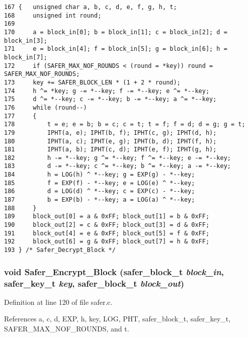 \footnotesize\begin{verbatim}167 {   unsigned char a, b, c, d, e, f, g, h, t;
168     unsigned int round;
169 
170     a = block_in[0]; b = block_in[1]; c = block_in[2]; d = block_in[3];
171     e = block_in[4]; f = block_in[5]; g = block_in[6]; h = block_in[7];
172     if (SAFER_MAX_NOF_ROUNDS < (round = *key)) round = SAFER_MAX_NOF_ROUNDS;
173     key += SAFER_BLOCK_LEN * (1 + 2 * round);
174     h ^= *key; g -= *--key; f -= *--key; e ^= *--key;
175     d ^= *--key; c -= *--key; b -= *--key; a ^= *--key;
176     while (round--)
177     {
178         t = e; e = b; b = c; c = t; t = f; f = d; d = g; g = t;
179         IPHT(a, e); IPHT(b, f); IPHT(c, g); IPHT(d, h);
180         IPHT(a, c); IPHT(e, g); IPHT(b, d); IPHT(f, h);
181         IPHT(a, b); IPHT(c, d); IPHT(e, f); IPHT(g, h);
182         h -= *--key; g ^= *--key; f ^= *--key; e -= *--key;
183         d -= *--key; c ^= *--key; b ^= *--key; a -= *--key;
184         h = LOG(h) ^ *--key; g = EXP(g) - *--key;
185         f = EXP(f) - *--key; e = LOG(e) ^ *--key;
186         d = LOG(d) ^ *--key; c = EXP(c) - *--key;
187         b = EXP(b) - *--key; a = LOG(a) ^ *--key;
188     }
189     block_out[0] = a & 0xFF; block_out[1] = b & 0xFF;
190     block_out[2] = c & 0xFF; block_out[3] = d & 0xFF;
191     block_out[4] = e & 0xFF; block_out[5] = f & 0xFF;
192     block_out[6] = g & 0xFF; block_out[7] = h & 0xFF;
193 } /* Safer_Decrypt_Block */
\end{verbatim}\normalsize 
{}
\subsubsection{\setlength{\rightskip}{0pt plus 5cm}void Safer\_\-Encrypt\_\-Block ({\bf safer\_\-block\_\-t} {\em block\_\-in}, {\bf safer\_\-key\_\-t} {\em key}, {\bf safer\_\-block\_\-t} {\em block\_\-out})}\label{safer_8c_a10}




Definition at line 120 of file safer.c.

References a, c, d, EXP, h, key, LOG, PHT, safer\_\-block\_\-t, safer\_\-key\_\-t, SAFER\_\-MAX\_\-NOF\_\-ROUNDS, and t.



